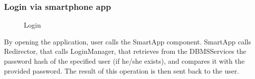 \subsubsection{Login via smartphone app}
\begin{figure}[H]
	\noindent
	\caption{Login} 
\end{figure}
By opening the application, user calls the SmartApp component. SmartApp calls Redirector, that calls LoginManager, that retrieves from the DBMSServices the password hash of the specified user (if he/she exists), and compares it with the provided password. The result of this operation is then sent back to the user.\\
